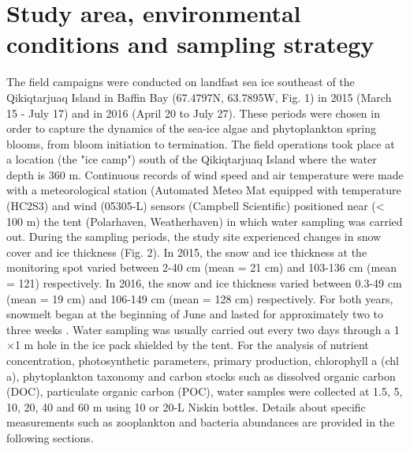 \documentclass[essd, manuscript]{copernicus}
\begin{document}
\section{Study area, environmental conditions and sampling strategy}

The field campaigns were conducted on landfast sea ice southeast of the Qikiqtarjuaq Island in Baffin Bay (67.4797N, 63.7895W, Fig. 1) in 2015 (March 15 - July 17) and in 2016 (April 20 to July 27). These periods were chosen in order to capture the dynamics of the sea-ice algae and phytoplankton spring blooms, from bloom initiation to termination. The field operations took place at a location (the "ice camp") south of the Qikiqtarjuaq Island where the water depth is 360 m. Continuous records of wind speed and air temperature were made with a meteorological station (Automated Meteo Mat equipped with temperature (HC2S3) and wind (05305-L) sensors (Campbell Scientific) positioned near (< 100 m) the tent (Polarhaven, Weatherhaven) in which water sampling was carried out. During the sampling periods, the study site experienced changes in snow cover and ice thickness (Fig. 2). In 2015, the snow and ice thickness at the monitoring spot varied between 2-40 cm (mean = 21 cm) and 103-136 cm (mean = 121) respectively. In 2016, the snow and ice thickness varied between 0.3-49 cm (mean = 19 cm) and 106-149 cm (mean = 128 cm) respectively. For both years, snowmelt began at the beginning of June and lasted for approximately two to three weeks \citep{Oziel2019}. Water sampling was usually carried out every two days through a 1$\times$1 m hole in the ice pack shielded by the tent. For the analysis of nutrient concentration, photosynthetic parameters, primary production, chlorophyll a (chl a), phytoplankton taxonomy and carbon stocks such as dissolved organic carbon (DOC), particulate organic carbon (POC), water samples were collected at 1.5, 5, 10, 20, 40 and 60 m using 10 or 20-L Niskin bottles. Details about specific measurements such as zooplankton and bacteria abundances are provided in the following sections.
\end{document}
